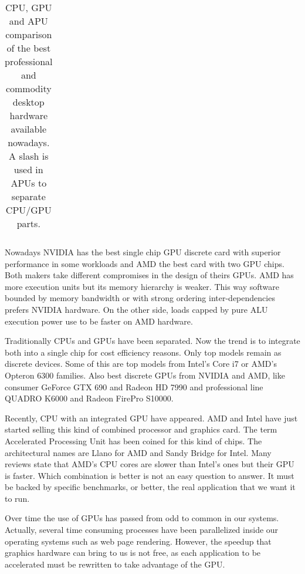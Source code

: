 \documentclass{comjnl}
\begin{document}
\begin{table*}[h]
\begin{tabular}{|c|c|c|c|c|c|c|c|c|}
\end{tabular}
\caption{CPU, GPU and APU comparison of the best professional and
  commodity desktop hardware available nowadays. A slash is used in
  APUs to separate CPU/GPU parts. 
\label{tab:features}}
\end{table*}

Nowadays NVIDIA has the best single chip GPU discrete card with
superior performance in some workloads and AMD the best card with two
GPU chips. Both makers take different compromises in the design of
theirs GPUs. AMD has more execution units but its memory hierarchy is
weaker. This way software bounded by memory bandwidth or with strong
ordering inter-dependencies prefers NVIDIA hardware. On the other
side, loads capped by pure ALU execution power use to be faster on AMD
hardware. %


Traditionally CPUs and GPUs have been separated. %
Now %
 the trend is to integrate both into a single chip for cost efficiency
 reasons. Only top models remain as discrete devices. Some of this are
 top models from Intel's Core i7 or AMD's Opteron 6300 families. Also
 best discrete GPUs from NVIDIA and AMD, like consumer GeForce GTX 690
 and Radeon HD 7990 and professional line QUADRO K6000 and Radeon
 FirePro S10000. 

Recently, %
CPU with an integrated GPU have appeared. AMD and Intel have just
started selling this kind of combined processor and graphics card. The
term Accelerated Processing Unit has been coined for this kind of
chips. The architectural names are Llano for AMD and Sandy Bridge for
Intel. Many reviews state that AMD's CPU cores are slower than Intel's
ones but their GPU is faster. Which combination is better is not an
easy question to answer. It must be backed by specific benchmarks, or
better, the real application that we want it to run. %

Over time the use of GPUs has passed from odd to common in our
systems. Actually, several time consuming processes have been
parallelized inside our operating systems such as web page
rendering. However, the speedup that graphics hardware can bring to us
is not free, as each application to be accelerated must be rewritten
to take advantage of the GPU. 
\end{document}
